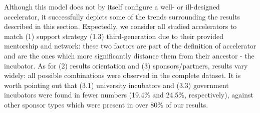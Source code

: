 \documentclass[
  12pt,
]{article}
\begin{document}
Although this model does not by itself configure a well- or ill-designed accelerator, it successfully depicts some of the trends surrounding the results described in this section. Expectedly, we consider all studied accelerators to match (1) support strategy (1.3) third-generation due to their provided mentorship and network: these two factors are part of the definition of accelerator and are the ones which more significantly distance them from their ancestor - the incubator. As for (2) results orientation and (3) sponsors/partners, results vary widely: all possible combinations were observed in the complete dataset. It is worth pointing out that (3.1) university incubators and (3.3) government incubators were found in fewer numbers (19.4\% and 24.5\%, respectively), against other sponsor types which were present in over 80\% of our results.

~

\onehalfspacing
\end{document}
